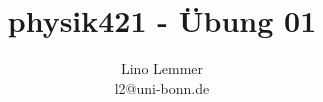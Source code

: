

\setcounter{thezettel}{1}
\renewcommand\thesection{\arabic{thezettel}.\arabic{section}}

\title{physik421 - Übung 01}
\author{Lino Lemmer \\ \small{l2@uni-bonn.de}}


\maketitle


